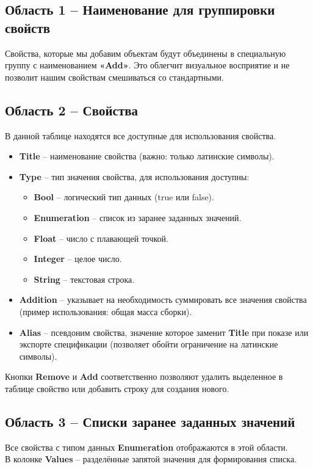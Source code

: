 \documentclass[a4paper,12pt]{article}
\begin{document}
\subsection{Область 1 -- Наименование для группировки свойств}
Свойства, которые мы добавим объектам будут объединены в специальную группу с наименованием \textbf{«Add»}. Это облегчит визуальное восприятие и не позволит нашим свойствам смешиваться со стандартными.

\pagebreak


\subsection{Область 2 -- Свойства}

В данной таблице находятся все доступные для использования свойства.
\begin{itemize}
	\item \textbf{Title} -- наименование свойства (важно: только латинские символы).
	\item \textbf{Type} -- тип значения свойства, для использования доступны:
	\begin{itemize}
		\item \textbf{Bool} -- логический тип данных (true или false).
		\item \textbf{Enumeration} -- список из заранее заданных значений.
		\item \textbf{Float} -- число с плавающей точкой.
		\item \textbf{Integer} -- целое число.
		\item \textbf{String} -- текстовая строка.
	\end{itemize}
	\item \textbf{Addition} -- указывает на необходимость суммировать все значения свойства\\(пример использования: общая масса сборки).
	\item \textbf{Alias} -- псевдоним свойства, значение которое заменит \textbf{Title} при показе или\\ экспорте спецификации (позволяет обойти ограничение на латинские символы).
\end{itemize}

\begin{flushleft}Кнопки \textbf{Remove} и \textbf{Add} соответственно позволяют удалить выделенное в таблице свойство или добавить строку для создания нового.\end{flushleft}

\subsection{Область 3 -- Списки заранее заданных значений}
Все свойства с типом данных \textbf{Enumeration} отображаются в этой области.\\В колонке \textbf{Values} -- разделённые запятой значения для формирования списка.
\end{document}
